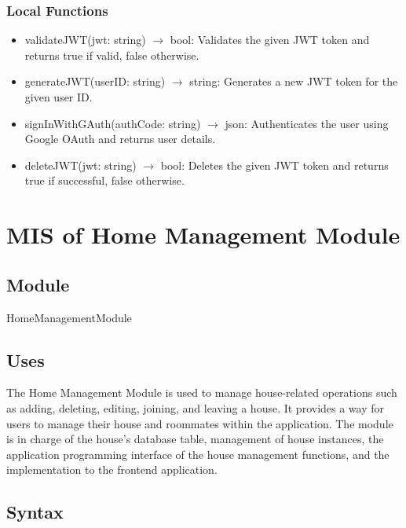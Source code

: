 \documentclass[12pt, titlepage]{article}
\begin{document}
\subsubsection{Local Functions}

\begin{itemize}
  \item validateJWT(jwt: string) $\rightarrow$ bool: Validates the given JWT token and returns true if valid, false otherwise.
  \item generateJWT(userID: string) $\rightarrow$ string: Generates a new JWT token for the given user ID.
  \item signInWithGAuth(authCode: string) $\rightarrow$ json: Authenticates the user using Google OAuth and returns user details.
  \item deleteJWT(jwt: string) $\rightarrow$ bool: Deletes the given JWT token and returns true if successful, false otherwise.
\end{itemize}

\newpage


\section{MIS of Home Management Module} \label{Module} 

\subsection{Module}

HomeManagementModule

\subsection{Uses}

The Home Management Module is used to manage house-related operations such as adding, deleting, editing, joining, and leaving a house. It provides a way for users to manage their house and roommates within the application. The module is in charge of the house's database table, management of house instances, the application programming interface of the house management functions, and the implementation to the frontend application.

\subsection{Syntax}
\end{document}
